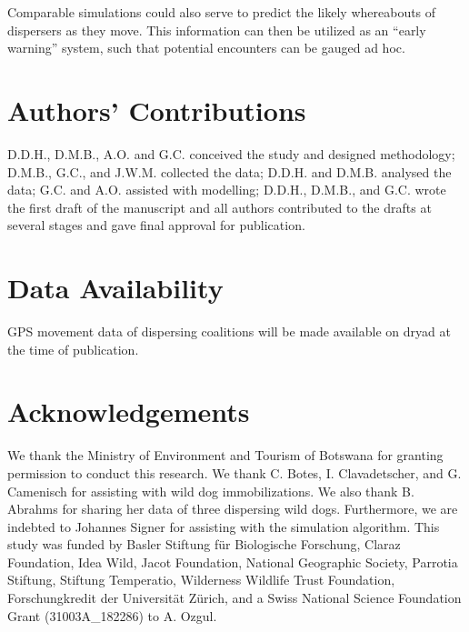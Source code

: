 \documentclass[abstract=on,10pt,a4paper,bibliography=totocnumbered]{article}
\begin{document}
Comparable simulations could also serve to predict the likely whereabouts of
dispersers as they move. This information can then be utilized as an  ``early
warning'' system, such that potential encounters can be gauged ad hoc.

\section{Authors' Contributions}
D.D.H., D.M.B., A.O. and G.C. conceived the study and designed methodology;
D.M.B., G.C., and J.W.M. collected the data; D.D.H. and D.M.B. analysed the
data; G.C. and A.O. assisted with modelling; D.D.H., D.M.B., and G.C. wrote the
first draft of the manuscript and all authors contributed to the drafts at
several stages and gave final approval for publication.

\section{Data Availability}
GPS movement data of dispersing coalitions will be made available on dryad at
the time of publication.

\section{Acknowledgements}
We thank the Ministry of Environment and Tourism of Botswana for granting
permission to conduct this research. We thank C. Botes, I. Clavadetscher, and G.
Camenisch for assisting with wild dog immobilizations. We also thank B. Abrahms
for sharing her data of three dispersing wild dogs. Furthermore, we are indebted
to Johannes Signer for assisting with the simulation algorithm. This study was
funded by Basler Stiftung für Biologische Forschung, Claraz Foundation, Idea
Wild, Jacot Foundation, National Geographic Society, Parrotia Stiftung, Stiftung
Temperatio, Wilderness Wildlife Trust Foundation, Forschungkredit der
Universität Zürich, and a Swiss National Science Foundation Grant
(31003A\_182286) to A. Ozgul.

\newpage
\begingroup
\singlespacing

\endgroup
\end{document}
